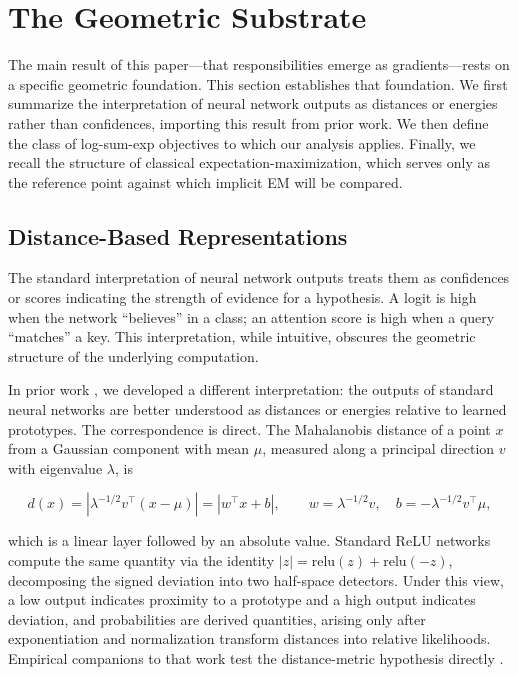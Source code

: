 \section{The Geometric Substrate}

The main result of this paper---that responsibilities emerge as gradients---rests on a specific geometric foundation. This section establishes that foundation. We first summarize the interpretation of neural network outputs as distances or energies rather than confidences, importing this result from prior work. We then define the class of log-sum-exp objectives to which our analysis applies. Finally, we recall the structure of classical expectation-maximization, which serves only as the reference point against which implicit EM will be compared.

\subsection{Distance-Based Representations}
\label{sec:distance}

The standard interpretation of neural network outputs treats them as confidences or scores indicating the strength of evidence for a hypothesis. A logit is high when the network ``believes'' in a class; an attention score is high when a query ``matches'' a key. This interpretation, while intuitive, obscures the geometric structure of the underlying computation.

In prior work \citep{oursland2024interpreting}, we developed a different interpretation: the outputs of standard neural networks are better understood as distances or energies relative to learned prototypes. The correspondence is direct. The Mahalanobis distance of a point $x$ from a Gaussian component with mean $\mu$, measured along a principal direction $v$ with eigenvalue $\lambda$, is

\begin{equation}
d(x) = |\lambda^{-1/2} v^\top (x - \mu)| = |w^\top x + b|, \qquad w = \lambda^{-1/2} v, \quad b = -\lambda^{-1/2} v^\top \mu,
\end{equation}

which is a linear layer followed by an absolute value. Standard ReLU networks compute the same quantity via the identity $|z| = \mathrm{relu}(z) + \mathrm{relu}(-z)$, decomposing the signed deviation into two half-space detectors. Under this view, a low output indicates proximity to a prototype and a high output indicates deviation, and probabilities are derived quantities, arising only after exponentiation and normalization transform distances into relative likelihoods. Empirical companions to that work test the distance-metric hypothesis directly \citep{oursland2024distance,oursland2025learn}.

